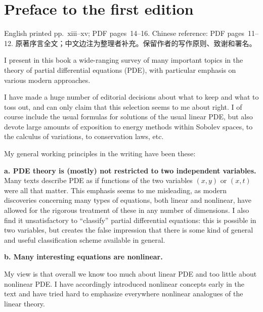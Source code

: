 \chapter*{Preface to the first edition}
%
  {English printed pp.~xiii--xv; PDF pages~14--16.
   Chinese reference: PDF pages~11--12.\newline
   原著序言全文；中文边注为整理者补充。保留作者的写作原则、致谢和署名。}

I present in this book a wide-ranging survey of many important topics in the
theory of partial differential equations (PDE), with particular emphasis on
various modern approaches.%

I have made a huge number of editorial decisions
about what to keep and what to toss out, and can only claim that this selection
seems to me about right. I of course include the usual formulas for solutions
of the usual linear PDE, but also devote large amounts of exposition to energy
methods within Sobolev spaces, to the calculus of variations, to conservation
laws, etc.

My general working principles in the writing have been these:

\noindent\textbf{a. PDE theory is (mostly) not restricted to two independent variables.}
Many texts describe PDE as if functions of the two variables $(x,y)$ or $(x,t)$
were all that matter. This emphasis seems to me misleading, as modern
discoveries concerning many types of equations, both linear and nonlinear,
have allowed for the rigorous treatment of these in any number of dimensions.
I also find it unsatisfactory to ``classify'' partial differential equations:
this is possible in two variables, but creates the false impression that there
is some kind of general and useful classification scheme available in general.

\noindent\textbf{b. Many interesting equations are nonlinear.}

My view is that overall we know too much about linear PDE and too little about
nonlinear PDE. I have accordingly introduced nonlinear concepts early in the
text and have tried hard to emphasize everywhere nonlinear analogues of the
linear theory.

